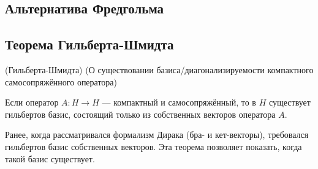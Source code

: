 \documentclass[12pt]{article}
\begin{document}
	\subsection{Альтернатива Фредгольма}
	
	\subsection{Теорема Гильберта-Шмидта}
	\begin{theorem}
		(Гильберта-Шмидта) (О существовании базиса/диагонализируемости компактного самосопряжённого оператора)
		
		Если оператор $A : H \rightarrow H$ --- компактный и самосопряжённый, то в $H$ существует гильбертов 
		базис, состоящий только из собственных векторов оператора $A$.
	\end{theorem}
	Ранее, когда рассматривался формализм Дирака (бра- и кет-векторы), требовался гильбертов базис собственных
	векторов. Эта теорема позволяет показать, когда такой базис существует.
\end{document}
